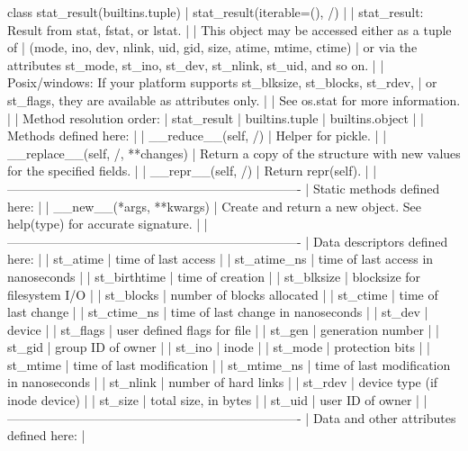 \documentclass{article}
\begin{document}
    class stat_result(builtins.tuple)
     |  stat_result(iterable=(), /)
     |
     |  stat_result: Result from stat, fstat, or lstat.
     |
     |  This object may be accessed either as a tuple of
     |    (mode, ino, dev, nlink, uid, gid, size, atime, mtime, ctime)
     |  or via the attributes st_mode, st_ino, st_dev, st_nlink, st_uid, and so on.
     |
     |  Posix/windows: If your platform supports st_blksize, st_blocks, st_rdev,
     |  or st_flags, they are available as attributes only.
     |
     |  See os.stat for more information.
     |
     |  Method resolution order:
     |      stat_result
     |      builtins.tuple
     |      builtins.object
     |
     |  Methods defined here:
     |
     |  __reduce__(self, /)
     |      Helper for pickle.
     |
     |  __replace__(self, /, **changes)
     |      Return a copy of the structure with new values for the specified fields.
     |
     |  __repr__(self, /)
     |      Return repr(self).
     |
     |  ----------------------------------------------------------------------
     |  Static methods defined here:
     |
     |  __new__(*args, **kwargs)
     |      Create and return a new object.  See help(type) for accurate signature.
     |
     |  ----------------------------------------------------------------------
     |  Data descriptors defined here:
     |
     |  st_atime
     |      time of last access
     |
     |  st_atime_ns
     |      time of last access in nanoseconds
     |
     |  st_birthtime
     |      time of creation
     |
     |  st_blksize
     |      blocksize for filesystem I/O
     |
     |  st_blocks
     |      number of blocks allocated
     |
     |  st_ctime
     |      time of last change
     |
     |  st_ctime_ns
     |      time of last change in nanoseconds
     |
     |  st_dev
     |      device
     |
     |  st_flags
     |      user defined flags for file
     |
     |  st_gen
     |      generation number
     |
     |  st_gid
     |      group ID of owner
     |
     |  st_ino
     |      inode
     |
     |  st_mode
     |      protection bits
     |
     |  st_mtime
     |      time of last modification
     |
     |  st_mtime_ns
     |      time of last modification in nanoseconds
     |
     |  st_nlink
     |      number of hard links
     |
     |  st_rdev
     |      device type (if inode device)
     |
     |  st_size
     |      total size, in bytes
     |
     |  st_uid
     |      user ID of owner
     |
     |  ----------------------------------------------------------------------
     |  Data and other attributes defined here:
     |
\end{document}
